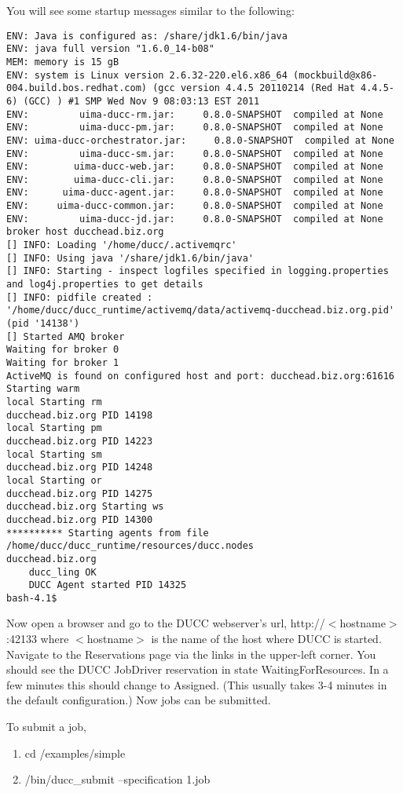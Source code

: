   You will see some startup messages similar to the following:

\begin{verbatim}
ENV: Java is configured as: /share/jdk1.6/bin/java
ENV: java full version "1.6.0_14-b08"
MEM: memory is 15 gB
ENV: system is Linux version 2.6.32-220.el6.x86_64 (mockbuild@x86-004.build.bos.redhat.com) (gcc version 4.4.5 20110214 (Red Hat 4.4.5-6) (GCC) ) #1 SMP Wed Nov 9 08:03:13 EST 2011
ENV:         uima-ducc-rm.jar:     0.8.0-SNAPSHOT  compiled at None
ENV:         uima-ducc-pm.jar:     0.8.0-SNAPSHOT  compiled at None
ENV: uima-ducc-orchestrator.jar:     0.8.0-SNAPSHOT  compiled at None
ENV:         uima-ducc-sm.jar:     0.8.0-SNAPSHOT  compiled at None
ENV:        uima-ducc-web.jar:     0.8.0-SNAPSHOT  compiled at None
ENV:        uima-ducc-cli.jar:     0.8.0-SNAPSHOT  compiled at None
ENV:      uima-ducc-agent.jar:     0.8.0-SNAPSHOT  compiled at None
ENV:     uima-ducc-common.jar:     0.8.0-SNAPSHOT  compiled at None
ENV:         uima-ducc-jd.jar:     0.8.0-SNAPSHOT  compiled at None
broker host ducchead.biz.org
[] INFO: Loading '/home/ducc/.activemqrc'
[] INFO: Using java '/share/jdk1.6/bin/java'
[] INFO: Starting - inspect logfiles specified in logging.properties and log4j.properties to get details
[] INFO: pidfile created : '/home/ducc/ducc_runtime/activemq/data/activemq-ducchead.biz.org.pid' (pid '14138')
[] Started AMQ broker
Waiting for broker 0
Waiting for broker 1
ActiveMQ is found on configured host and port: ducchead.biz.org:61616
Starting warm
local Starting rm
ducchead.biz.org PID 14198
local Starting pm
ducchead.biz.org PID 14223
local Starting sm
ducchead.biz.org PID 14248
local Starting or
ducchead.biz.org PID 14275
ducchead.biz.org Starting ws
ducchead.biz.org PID 14300
********** Starting agents from file /home/ducc/ducc_runtime/resources/ducc.nodes
ducchead.biz.org
    ducc_ling OK
    DUCC Agent started PID 14325
bash-4.1$
\end{verbatim}

  Now open a browser and go to the DUCC webserver's url, http://$<$hostname$>$:42133 where $<$hostname$>$ is
  the name of the host where DUCC is started.  Navigate to the Reservations page via the links in
  the upper-left corner.  You should see the DUCC JobDriver reservation in state
  WaitingForResources.  In a few minutes this should change to Assigned.  (This usually takes 3-4
  minutes in the default configuration.) Now jobs can be submitted.

  To submit a job,
  \begin{enumerate}
    \item cd \duccruntime/examples/simple
    \item \duccruntime/bin/ducc\_submit --specification 1.job
    \end{enumerate}
    
